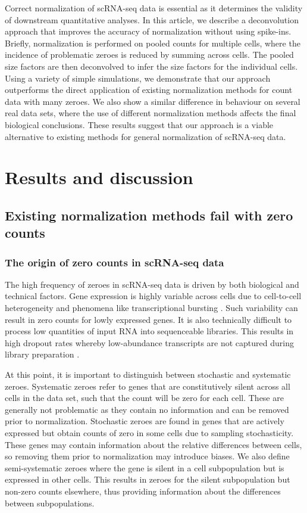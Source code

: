 \documentclass{bmcart}
\begin{document}
Correct normalization of scRNA-seq data is essential as it determines the validity of downstream quantitative analyses.
In this article, we describe a deconvolution approach that improves the accuracy of normalization without using spike-ins.
Briefly, normalization is performed on pooled counts for multiple cells, where the incidence of problematic zeroes is reduced by summing across cells.
The pooled size factors are then deconvolved to infer the size factors for the individual cells.
Using a variety of simple simulations, we demonstrate that our approach outperforms the direct application of existing normalization methods for count data with many zeroes.
We also show a similar difference in behaviour on several real data sets, where the use of different normalization methods affects the final biological conclusions.
These results suggest that our approach is a viable alternative to existing methods for general normalization of scRNA-seq data.

\section*{Results and discussion}

\subsection*{Existing normalization methods fail with zero counts}

\subsubsection*{The origin of zero counts in scRNA-seq data}
The high frequency of zeroes in scRNA-seq data is driven by both biological and technical factors.
Gene expression is highly variable across cells due to cell-to-cell heterogeneity and phenomena like transcriptional bursting \cite{marinov2014singlecell}.
Such variability can result in zero counts for lowly expressed genes.
It is also technically difficult to process low quantities of input RNA into sequenceable libraries.
This results in high dropout rates whereby low-abundance transcripts are not captured during library preparation \cite{brennecke2013accounting}.

At this point, it is important to distinguish between stochastic and systematic zeroes.
Systematic zeroes refer to genes that are constitutively silent across all cells in the data set, such that the count will be zero for each cell.
These are generally not problematic as they contain no information and can be removed prior to normalization.
Stochastic zeroes are found in genes that are actively expressed but obtain counts of zero in some cells due to sampling stochasticity.
These genes may contain information about the relative differences between cells, so removing them prior to normalization may introduce biases.
We also define semi-systematic zeroes where the gene is silent in a cell subpopulation but is expressed in other cells.
This results in zeroes for the silent subpopulation but non-zero counts elsewhere, thus providing information about the differences between subpopulations.
\end{document}
